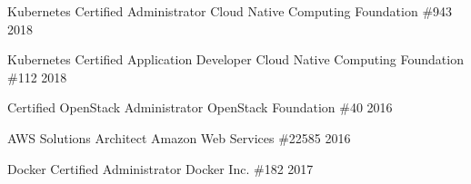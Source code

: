 

\begin{cvhonors}

  \cvhonor
    {Kubernetes Certified Administrator}
    {Cloud Native Computing Foundation}
    {\#943}
    {2018} %

  \cvhonor
    {Kubernetes Certified Application Developer}
    {Cloud Native Computing Foundation}
    {\#112}
    {2018} %

  \cvhonor
    {Certified OpenStack Administrator}
    {OpenStack Foundation}
    {\#40}
    {2016} %

  \cvhonor
    {AWS Solutions Architect}
    {Amazon Web Services}
    {\#22585}
    {2016} %

  \cvhonor
    {Docker Certified Administrator}
    {Docker Inc.}
    {\#182}
    {2017} %

\end{cvhonors}
